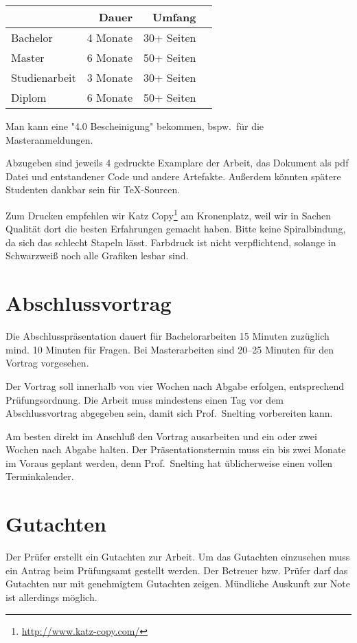 \begin{center}
\begin{tabular}{lrrr}
\toprule
 & Dauer & Umfang \\
\midrule
Bachelor      & 4 Monate & 30+ Seiten \\
Master        & 6 Monate & 50+ Seiten \\
Studienarbeit & 3 Monate & 30+ Seiten \\
Diplom        & 6 Monate & 50+ Seiten \\
\bottomrule
\end{tabular}
\end{center}

Man kann eine "4.0 Bescheinigung" bekommen,
bspw.\ für die Masteranmeldungen.

Abzugeben sind jeweils 4 gedruckte Examplare der Arbeit,
das Dokument als pdf Datei
und entstandener Code und andere Artefakte.
Außerdem könnten spätere Studenten dankbar sein für \TeX-Sourcen.

Zum Drucken empfehlen wir
Katz Copy\footnote{\url{http://www.katz-copy.com/}} am Kronenplatz,
weil wir in Sachen Qualität dort die besten Erfahrungen gemacht haben.
Bitte keine Spiralbindung,
da sich das schlecht Stapeln lässt.
Farbdruck ist nicht verpflichtend,
solange in Schwarzweiß noch alle Grafiken lesbar sind.

\section{Abschlussvortrag}

Die Abschlusspräsentation dauert für Bachelorarbeiten 15 Minuten
zuzüglich mind. 10 Minuten für Fragen.
Bei Masterarbeiten sind 20--25 Minuten für den Vortrag vorgesehen.

Der Vortrag soll innerhalb von vier Wochen nach Abgabe erfolgen,
entsprechend Prüfungsordnung.
Die Arbeit muss mindestens einen Tag vor dem Abschlussvortrag abgegeben sein,
damit sich Prof.~Snelting vorbereiten kann.

Am besten direkt im Anschluß den Vortrag ausarbeiten und ein oder zwei Wochen nach Abgabe halten.
Der Präsentationstermin muss ein bis zwei Monate im Voraus geplant werden,
denn Prof.~Snelting hat üblicherweise einen vollen Terminkalender.

\section{Gutachten}

Der Prüfer erstellt ein Gutachten zur Arbeit.
Um das Gutachten einzusehen muss ein Antrag beim Prüfungsamt gestellt werden.
Der Betreuer bzw. Prüfer darf das Gutachten nur mit genehmigtem Gutachten zeigen.
Mündliche Auskunft zur Note ist allerdings möglich.


